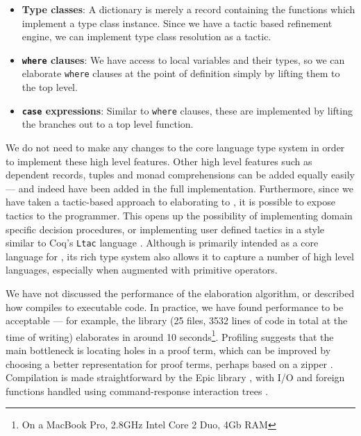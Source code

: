 \begin{itemize}
\item \textbf{Type classes}: A dictionary is merely a record containing the
functions which implement a type class instance. Since we have a tactic based
refinement engine, we can implement type class resolution as a tactic.
\item \textbf{\texttt{where} clauses}: We have access to local variables and
their types, so we can
elaborate \texttt{where} clauses at the point of definition simply by lifting
them to the top level. 
\item \textbf{\texttt{case} expressions}: Similar to \texttt{where} clauses,
these are implemented by lifting the branches out to a top level function.
\end{itemize}

We do not need to make any changes to the core language type system in order to 
implement these high level features. 
Other high level features such as dependent records, tuples and monad comprehensions
can be added equally easily --- and indeed have been added in the full implementation.  
Furthermore, 
since we have taken a tactic-based approach to elaborating \Idris{} to \TT{},
it is possible to expose tactics to the programmer. This opens up
the possibility of implementing domain specific decision procedures, or
implementing user defined tactics in a style similar to Coq's \texttt{Ltac}
language \cite{Delahaye2000}.  Although \TT{} is primarily intended as a core
language for \Idris{}, its rich type system also allows it to capture a number
of high level languages, especially when augmented with primitive operators. 

We have not discussed the performance of the elaboration
algorithm, or described how \Idris{} compiles to executable code. In practice,
we have found performance to be acceptable --- for example, the \Idris{}
library (25 files, 3532 lines of code in total at the time of writing)
elaborates in around 10 seconds\footnote{On a MacBook Pro, 2.8GHz Intel Core 2
Duo, 4Gb RAM}. Profiling suggests that the main bottleneck is locating holes
in a proof term, which can be improved by choosing a better representation
for proof terms, perhaps based on a zipper \cite{Huet1997}. Compilation is made
straightforward by the Epic library \cite{brady2011epic}, with I/O and foreign
functions handled using command-response interaction trees \cite{Hancock2000}.


